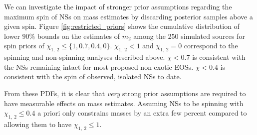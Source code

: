 We can investigate the impact of stronger prior assumptions regarding the maximum spin of NSs on mass estimates by discarding posterior samples above a given spin.  Figure \ref{fig:restricted_priors} shows the cumulative distribution of lower $90\%$ bounds on the estimates of $m_2$ among the 250 simulated sources for spin priors of $\chi_{1,~2} \leq \{1, 0.7, 0.4, 0\}$.  $\chi_{1,~2}<1$ and $\chi_{1,~2}=0$ correspond to the spinning and non-spinning analyses described above.  $\chi<0.7$ is consistent with the NSs remaining intact for most proposed non-exotic EOSs.  $\chi<0.4$ is consistent with the spin of observed, isolated NSs to date.

From these PDFs, it is clear that \emph{very} strong prior assumptions are required to have measurable effects on mass estimates. Assuming NSs to be spinning with $\chi_{1,~2}\leq 0.4$ a priori only constrains masses by an extra few percent compared to allowing them to have $\chi_{1,~2} \leq 1$.
  
  
